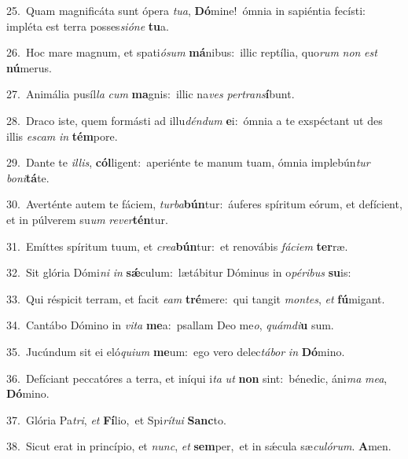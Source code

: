 {\numbfont\textcolor{\numbcolor}{25.}}~Quam magnificáta sunt ópera \textit{tu}\-\textit{a}, \textbf{Dó}\-mine!~\star ómnia in sapiéntia fecísti: impléta est terra posses\-\textit{si}\-\textit{ó}\textit{ne} \textbf{tu}\-a.\par
{\numbfont\textcolor{\numbcolor}{26.}}~Hoc mare magnum, et spati\-\textit{ó}\-\textit{sum} \textbf{má}\-nibus:~\star illic reptília, quo\textit{rum} \textit{non} \textit{est} \textbf{nú}\-merus.\par
{\numbfont\textcolor{\numbcolor}{27.}}~Animália pusíl\textit{la} \textit{cum} \textbf{ma}\-gnis:~\star illic na\textit{ves} \textit{per}\-\textit{trans}\textbf{í}bunt.\par
{\numbfont\textcolor{\numbcolor}{28.}}~Draco iste, quem formásti ad illu\-\textit{dén}\-\textit{dum} \textbf{e}\-i:~\star ómnia a te exspéctant ut des illis \textit{es}\-\textit{cam} \textit{in} \textbf{tém}\-pore.\par
{\numbfont\textcolor{\numbcolor}{29.}}~Dante te \textit{il}\-\textit{lis}, \textbf{cól}\-ligent:~\star aperiénte te manum tuam, ómnia implebún\textit{tur} \textit{bo}\-\textit{ni}\textbf{tá}te.\par
{\numbfont\textcolor{\numbcolor}{30.}}~Averténte autem te fáciem, \textit{tur}\-\textit{ba}\textbf{bún}tur:~\star áuferes spíritum eórum, et defícient, et in púlverem su\textit{um} \textit{re}\-\textit{ver}\textbf{tén}tur.\par
{\numbfont\textcolor{\numbcolor}{31.}}~Emíttes spíritum tuum, et \textit{cre}\-\textit{a}\textbf{bún}tur:~\star et renovábis \textit{fá}\-\textit{ci}\textit{em} \textbf{ter}\-ræ.\par
{\numbfont\textcolor{\numbcolor}{32.}}~Sit glória Dómi\textit{ni} \textit{in} \textbf{sǽ}\-culum:~\star lætábitur Dóminus in o\-\textit{pé}\-\textit{ri}\textit{bus} \textbf{su}\-is:\par
{\numbfont\textcolor{\numbcolor}{33.}}~Qui réspicit terram, et facit \textit{e}\-\textit{am} \textbf{tré}\-mere:~\star qui tangit \textit{mon}\-\textit{tes}, \textit{et} \textbf{fú}\-migant.\par
{\numbfont\textcolor{\numbcolor}{34.}}~Cantábo Dómino in \textit{vi}\-\textit{ta} \textbf{me}\-a:~\star psallam Deo me\-\textit{o}\-, \textit{quám}\-\textit{di}\textbf{u} sum.\par
{\numbfont\textcolor{\numbcolor}{35.}}~Jucúndum sit ei eló\-\textit{qui}\-\textit{um} \textbf{me}\-um:~\star ego vero delec\-\textit{tá}\-\textit{bor} \textit{in} \textbf{Dó}\-mino.\par
{\numbfont\textcolor{\numbcolor}{36.}}~Defíciant peccatóres a terra, et iníqui i\textit{ta} \textit{ut} \textbf{non} sint:~\star bénedic, áni\textit{ma} \textit{me}\-\textit{a}, \textbf{Dó}\-mino.\par
{\numbfont\textcolor{\numbcolor}{37.}}~Glória Pa\-\textit{tri}\-, \textit{et} \textbf{Fí}\-lio,~\star et Spi\-\textit{rí}\-\textit{tu}\textit{i} \textbf{Sanc}\-to.\par
{\numbfont\textcolor{\numbcolor}{38.}}~Sicut erat in princípio, et \textit{nunc}\-, \textit{et} \textbf{sem}\-per,~\star et in sǽcula sæ\-\textit{cu}\-\textit{ló}\textit{rum}. \textbf{A}\-men.\par
